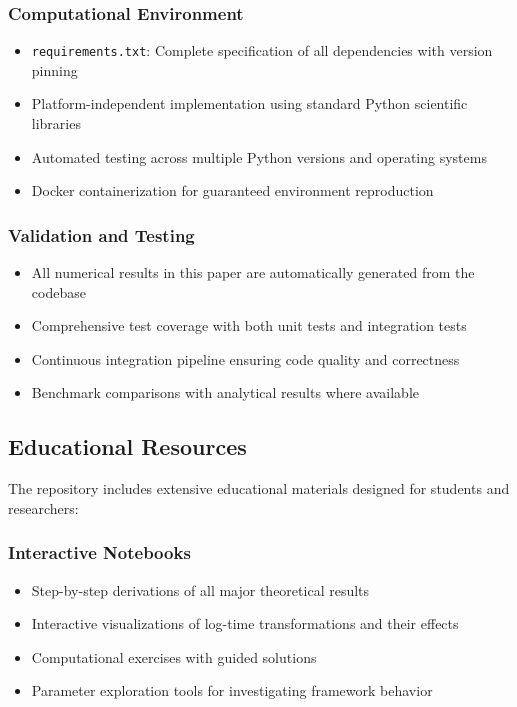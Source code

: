 \subsubsection{Computational Environment}

\begin{itemize}
\item \texttt{requirements.txt}: Complete specification of all dependencies with version pinning
\item Platform-independent implementation using standard Python scientific libraries
\item Automated testing across multiple Python versions and operating systems
\item Docker containerization for guaranteed environment reproduction
\end{itemize}

\subsubsection{Validation and Testing}

\begin{itemize}
\item All numerical results in this paper are automatically generated from the codebase
\item Comprehensive test coverage with both unit tests and integration tests
\item Continuous integration pipeline ensuring code quality and correctness
\item Benchmark comparisons with analytical results where available
\end{itemize}

\subsection{Educational Resources}
\label{subsec:educational_resources}

The repository includes extensive educational materials designed for students and researchers:

\subsubsection{Interactive Notebooks}

\begin{itemize}
\item Step-by-step derivations of all major theoretical results
\item Interactive visualizations of log-time transformations and their effects
\item Computational exercises with guided solutions
\item Parameter exploration tools for investigating framework behavior
\end{itemize}

